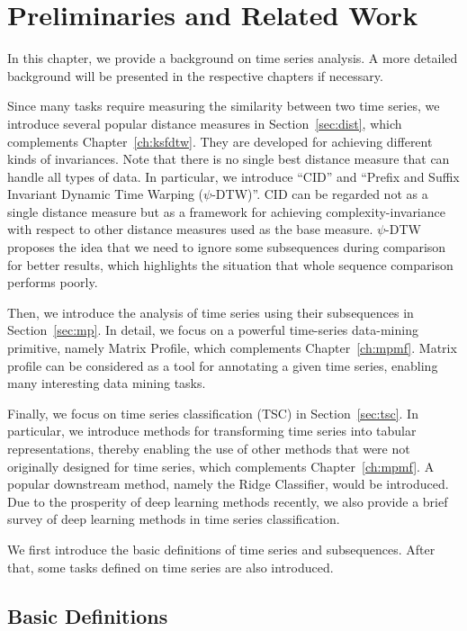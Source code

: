 \chapter{Preliminaries and Related Work} \label{ch:preliminaries}

In this chapter, we provide a background on time series analysis.
A more detailed background will be presented in the respective chapters if necessary.

Since many tasks require measuring the similarity between two time series, we introduce several popular distance measures in Section~\ref{sec:dist}, which complements Chapter~\ref{ch:ksfdtw}.
They are developed for achieving different kinds of invariances.
Note that there is no single best distance measure that can handle all types of data.
%
In particular, we introduce ``CID'' and ``Prefix and Suffix Invariant Dynamic Time Warping ($\psi$-DTW)''.
%
CID can be regarded not as a single distance measure but as a framework for achieving complexity-invariance with respect to other distance measures used as the base measure.
%
$\psi$-DTW proposes the idea that we need to ignore some subsequences during comparison for better results, which highlights the situation that whole sequence comparison performs poorly.

Then, we introduce the analysis of time series using their subsequences in Section~\ref{sec:mp}.
In detail, we focus on a powerful time-series data-mining primitive, namely Matrix Profile, which complements Chapter~\ref{ch:mpmf}.
Matrix profile can be considered as a tool for annotating a given time series, enabling many interesting data mining tasks.

Finally, we focus on time series classification (TSC) in Section~\ref{sec:tsc}.
In particular, we introduce methods for transforming time series into tabular representations, thereby enabling the use of other methods that were not originally designed for time series, which complements Chapter~\ref{ch:mpmf}.
A popular downstream method, namely the Ridge Classifier, would be introduced.
Due to the prosperity of deep learning methods recently, we also provide a brief survey of deep learning methods in time series classification.

We first introduce the basic definitions of time series and subsequences.
After that, some tasks defined on time series are also introduced.

\section{Basic Definitions} %

